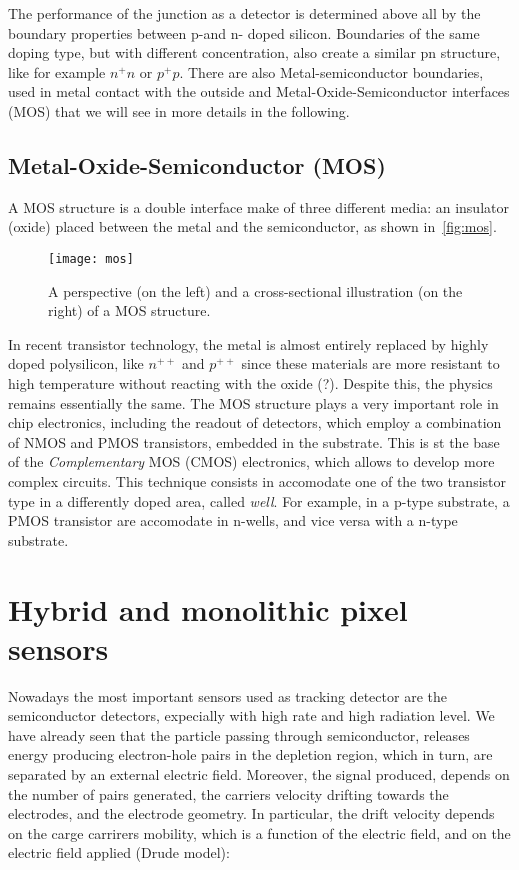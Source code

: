 The performance of the junction as a detector is determined above all by the boundary properties between p-and n- doped silicon. Boundaries of the same doping type, but with different concentration, also create a similar pn structure, like for example $n^{+}n$ or $p^{+}p$. There are also Metal-semiconductor boundaries, used in metal contact with the outside and Metal-Oxide-Semiconductor interfaces (MOS) that we will see in more details in the following.
 
 
\subsection{Metal-Oxide-Semiconductor (MOS)}

A MOS structure is a double interface make of three different media: an insulator (oxide) placed between the metal and the semiconductor, as shown in~\autoref{fig:mos}.

\begin{figure}[h!]
\centering
\texttt{[image: mos]}
\caption{A perspective (on the left) and a cross-sectional illustration (on the right) of a MOS structure.}
\label{fig:mos}
\end{figure}

In recent transistor technology, the metal is almost entirely replaced by highly doped polysilicon, like $n^{++}$ and $p^{++}$ since these materials are more resistant to high temperature without reacting with the oxide (?). Despite this, the physics remains essentially the same. 
The MOS structure plays a very important role in chip electronics, including the readout of detectors, which employ a combination of NMOS and PMOS transistors, embedded in the substrate. This is st the base of the \emph{Complementary} MOS (CMOS) electronics, which allows to develop more complex circuits. This technique consists in accomodate one of the two transistor type in a differently doped area, called \emph{well}. For example,  in a p-type substrate, a PMOS transistor are accomodate in n-wells, and vice versa with a n-type substrate. 


\section{Hybrid and monolithic pixel sensors}

Nowadays the most important sensors used as tracking detector are the semiconductor detectors, expecially with high rate and high radiation level. We have already seen that the particle passing through semiconductor, releases energy producing electron-hole pairs in the depletion region, which in turn, are separated by an external electric field. Moreover, the signal produced, depends on the number of pairs generated, the carriers velocity drifting towards the electrodes, and the electrode geometry. 
In particular, the drift velocity depends on the carge carrirers mobility, which is a function of the electric field, and on the electric field applied (Drude model):

